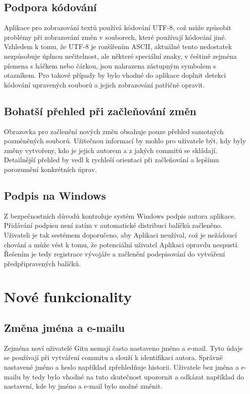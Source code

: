\subsection{Podpora kódování}

Aplikace pro zobrazování textů používá kódování UTF-8, což může způsobit problémy při zobrazování změn v souborech, které používají kódování jiné. Vzhledem k tomu, že UTF-8 je rozšířením ASCII, aktuálně tento nedostatek nezpůsobuje úplnou nečitelnost, ale některé speciální znaky, v češtině zejména písmena s háčkem nebo čárkou, jsou nahrazena zástupným symbolem s otazníkem. Pro takové případy by bylo vhodné do aplikace doplnit detekci kódování upravených souborů a jejich zobrazování patřičně opravit.

\subsection{Bohatší přehled při začleňování změn}

Obrazovka pro začlenění nových změn obsahuje pouze přehled samotných pozměněných souborů. Užitečnou informací by mohlo pro uživatele být, kdy byly změny vytvořeny, kdo je jejich autorem a z jakých commitů se skládají. Detailnější přehled by vedl k rychleší orientaci při začleňování a lepšímu porozumění konkrétních úprav.

\subsection{Podpis na Windows}

Z bezpečnostních důvodů kontroluje systém Windows podpis autora aplikace. Přidávání podpisu není zatím v automatické distribuci balíčků začleněno. Uživateli je tak sestémem doporučeno, aby Aplikaci neužíval, což je nežádoucí chování a může vést k tomu, že potenciální uživatel Aplikaci opravdu nespustí. Řešením je tedy registrace vývojáře a začlenění podepisování do vytváření předpřipravených balíčků.


\section{Nové funkcionality}

\subsection{Změna jména a e-mailu}

Zejména noví uživatelé Gitu nemají často nastaveno jméno a e-mail. Tyto údaje se používají při vytváření commitu a slouží k identifikaci autora. Správně nastavené jméno a heslo například zpřehledňuje historii. Uživatele bez jména a e-mailu by tedy bylo vhodné na tuto skutečnost upozornit a odkázat například do nastavení, kde by jméno a e-mail bylo možné změnit.

